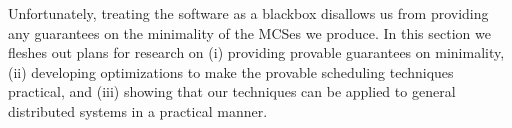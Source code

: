 Unfortunately, treating the software as a blackbox disallows us from
providing any guarantees on the minimality of the MCSes we produce.
In this section we fleshes out plans for research on
(i) providing provable guarantees on minimality, (ii) developing optimizations
to make the provable scheduling techniques practical, and (iii) showing
that our techniques can be applied to general distributed systems in a
practical manner.




